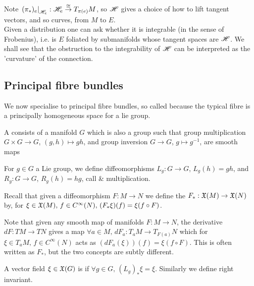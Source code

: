 \documentclass{article}
\begin{document}
Note $\left. (\pi_\ast)_e \right\rvert_{\mathscr{H}_e} : \mathscr{H}_e \overset{\cong}{\to} T_{\pi(e)}M$, so $\mathscr{H}$ gives a choice of how to lift tangent vectors, and so curves, from $M$ to $E$. \\
Given a distribution one can ask whether it is integrable (in the sense of Frobenius), i.e. is $E$ foliated by submanifolds whose tangent spaces are $\mathscr{H}$. We shall see that the obstruction to the integrability of $\mathscr{H}$ can be interpreted as the 'curvature' of the connection. 
\subsection{Principal fibre bundles}
We now specialise to principal fibre bundles, so called because the typical fibre is a principally homogeneous space for a lie group. 

\begin{definition}
	A  consists of a manifold $G$ which is also a group such that group multiplication $G \times G \to G$, $(g,h)\mapsto gh$, and group inversion $G \to G$, $g \mapsto g^{-1}$, are smooth maps
\end{definition}

For $g \in G$ a Lie group, we define diffeomorphisms $L_g : G \to G$, $L_g(h) = gh$, and $R_g : G \to G$, $R_g(h) = hg$, call  \&  multiplication. 

\begin{definition}
	Recall that given a diffeomorphism $F:M \to N$ we define the  $F_\ast : \mathfrak{X}(M) \to \mathfrak{X}(N)$ by, for $\xi \in \mathfrak{X}(M), \, f \in C^\infty(N), \, (F_\ast \xi)(f) = \xi(f \circ F)$.
\end{definition}

\begin{remark}
	Note that given any smooth map of manifolds $F:M \to N$, the derivative $dF:TM \to TN$ gives a map $\forall a \in M, \, dF_a : T_a M \to T_{F(a)}N$ which for $\xi \in T_a M, \, f \in C^\infty(N)$ acts as $(dF_a(\xi))(f) = \xi(f \circ F)$. This is often written as $F_\ast$, but the two concepts are subtly different.
\end{remark}

\begin{definition}
	A vector field $\xi\in \mathfrak{X}(G)$ is  if $\forall g \in G, \, (L_g)_\ast \xi = \xi$. Similarly we define right invariant.
\end{definition}
\end{document}
